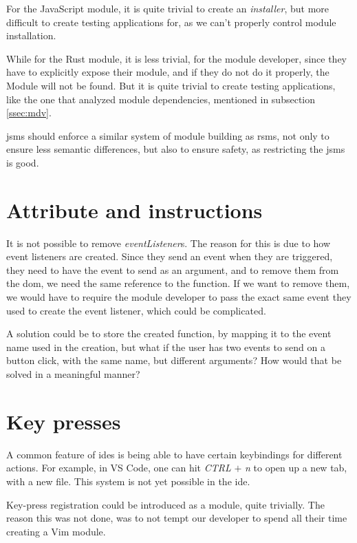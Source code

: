 For the JavaScript module, it is quite trivial to create an \textit{installer},
but more difficult to create testing applications for, as we can't properly
control module installation.

While for the Rust module, it is less trivial, for the module developer, since
they have to explicitly expose their module, and if they do not do it properly,
the Module will not be found. But it is quite trivial to create testing
applications, like the one that analyzed module dependencies, mentioned in
subsection \ref{ssec:mdv}.

\gls*{jsms} should enforce a similar system of module building as \gls*{rsms},
not only to ensure less semantic differences, but also to ensure safety, as
restricting the \gls*{jsms} is good.


\section{Attribute and instructions}

It is not possible to remove \textit{eventListener}s. The reason for this is due
to how event listeners are created. Since they send an event when they are
triggered, they need to have the event to send as an argument, and to remove
them from the \gls*{dom}, we need the same reference to the function. If we
want to remove them, we would have to require the module developer to pass the
exact same event they used to create the event listener, which could be
complicated.

A solution could be to store the created function, by mapping it to the event
name used in the creation, but what if the user has two events to send on a
button click, with the same name, but different arguments? How would that be
solved in a meaningful manner?


\section{Key presses}

A common feature of \gls*{ide}s is being able to have certain keybindings for
different actions. For example, in VS Code, one can hit \textit{CTRL}
$+$ \textit{n} to open up a new tab, with a new file. This system is not yet
possible in the \gls*{ide}.

Key-press registration could be introduced as a module, quite trivially. The
reason this was not done, was to not tempt our developer to spend all their time
creating a Vim module.


